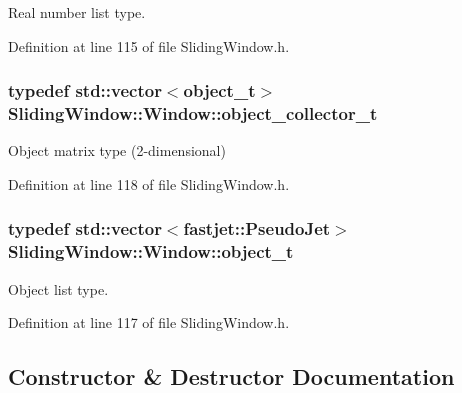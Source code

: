 Real number list type. 



Definition at line 115 of file Sliding\+Window.\+h.

\subsubsection[{\texorpdfstring{object\+\_\+collector\+\_\+t}{object_collector_t}}]{\setlength{\rightskip}{0pt plus 5cm}typedef std\+::vector$<${\bf object\+\_\+t}$>$ {\bf Sliding\+Window\+::\+Window\+::object\+\_\+collector\+\_\+t}}\hypertarget{classSlidingWindow_1_1Window_a3883a474287703a42cf8971ba8ef6884}{}\label{classSlidingWindow_1_1Window_a3883a474287703a42cf8971ba8ef6884}


Object matrix type (2-\/dimensional) 



Definition at line 118 of file Sliding\+Window.\+h.

\subsubsection[{\texorpdfstring{object\+\_\+t}{object_t}}]{\setlength{\rightskip}{0pt plus 5cm}typedef std\+::vector$<$fastjet\+::\+Pseudo\+Jet$>$ {\bf Sliding\+Window\+::\+Window\+::object\+\_\+t}}\hypertarget{classSlidingWindow_1_1Window_a0ee13c18faf2f2ec3855b6449ef765e0}{}\label{classSlidingWindow_1_1Window_a0ee13c18faf2f2ec3855b6449ef765e0}


Object list type. 



Definition at line 117 of file Sliding\+Window.\+h.



\subsection{Constructor \& Destructor Documentation}
